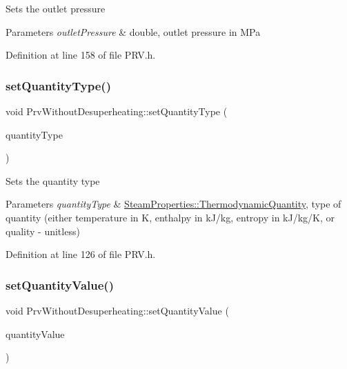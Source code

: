 Sets the outlet pressure


\begin{DoxyParams}{Parameters}
{\em outlet\+Pressure} & double, outlet pressure in M\+Pa \\
\hline
\end{DoxyParams}


Definition at line 158 of file P\+R\+V.\+h.

\mbox{\label{class_prv_without_desuperheating_a212177b7a16c7452358df4120196c04b}} 
\subsubsection{\texorpdfstring{set\+Quantity\+Type()}{setQuantityType()}}
{\footnotesize\ttfamily void Prv\+Without\+Desuperheating\+::set\+Quantity\+Type (\begin{DoxyParamCaption}\item[{\hyperlink{class_steam_properties_ae0294bedf7d178c2d8fb6aed0f62fbff}{Steam\+Properties\+::\+Thermodynamic\+Quantity}}]{quantity\+Type }\end{DoxyParamCaption})\hspace{0.3cm}{\ttfamily [inline]}}

Sets the quantity type


\begin{DoxyParams}{Parameters}
{\em quantity\+Type} & \hyperlink{class_steam_properties_ae0294bedf7d178c2d8fb6aed0f62fbff}{Steam\+Properties\+::\+Thermodynamic\+Quantity}, type of quantity (either temperature in K, enthalpy in k\+J/kg, entropy in k\+J/kg/K, or quality -\/ unitless) \\
\hline
\end{DoxyParams}


Definition at line 126 of file P\+R\+V.\+h.

\mbox{\label{class_prv_without_desuperheating_a5ed2d0f0f558705d482ed0502131757f}} 
\subsubsection{\texorpdfstring{set\+Quantity\+Value()}{setQuantityValue()}}
{\footnotesize\ttfamily void Prv\+Without\+Desuperheating\+::set\+Quantity\+Value (\begin{DoxyParamCaption}\item[{double}]{quantity\+Value }\end{DoxyParamCaption})\hspace{0.3cm}{\ttfamily [inline]}}

